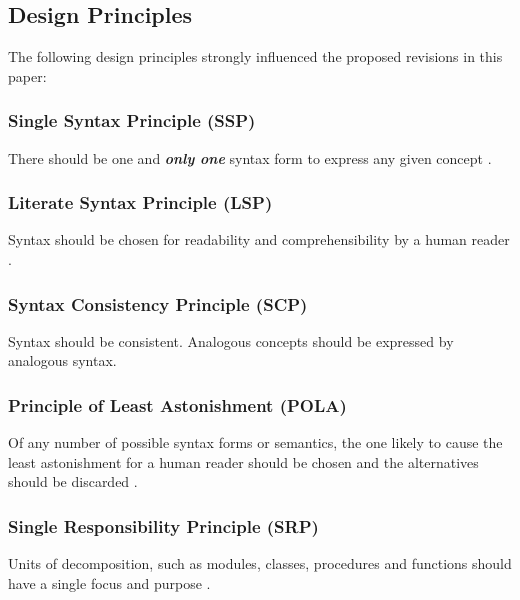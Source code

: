 \documentclass[10pt,a4paper,leqno,fleqn]{article}
\renewcommand{\emph}[1]{\textbf{\textit{#1}}}
\begin{document}
\subsection{Design Principles}
\label{design-principles}

The following design principles strongly influenced the proposed revisions in
this paper:

\subsubsection{Single Syntax Principle (SSP)}
\label{SSP}

There should be one and \emph{only one} syntax form to express any given
concept \cite{Dijkstra78}.

\subsubsection{Literate Syntax Principle (LSP)}
\label{LSP}

Syntax should be chosen for readability and comprehensibility by a human
reader \cite{Knuth84}.

\subsubsection{Syntax Consistency Principle (SCP)}
\label{SCP}

Syntax should be consistent. Analogous concepts should be expressed by
analogous syntax.

\subsubsection{Principle of Least Astonishment (POLA)}
\label{POLA}

Of any number of possible syntax forms or semantics, the one likely to cause
the least astonishment for a human reader should be chosen and the
alternatives should be discarded \cite{Geoffrey87}.

\subsubsection{Single Responsibility Principle (SRP)}
\label{SRP}

Units of decomposition, such as modules, classes, procedures and functions
should have a single focus and purpose \cite{Martin09}.
\end{document}
